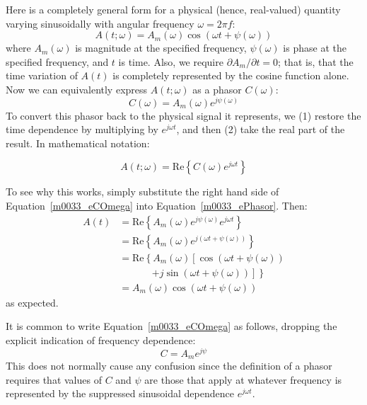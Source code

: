Here is a completely general form for a physical (hence, real-valued) quantity varying sinusoidally with angular frequency $\omega=2\pi f$:
%
\begin{equation}
A(t;\omega) = A_m(\omega) \cos{(\omega t + \psi(\omega))}
\end{equation} 
%
where 
$A_m(\omega)$ is magnitude at the specified frequency, 
$\psi(\omega)$ is phase at the specified frequency, 
and $t$ is time.  
Also, we require $\partial A_m/\partial t =0$; that is, that the time variation of $A(t)$ is completely represented by the cosine function alone. 
Now we can equivalently express $A(t;\omega)$ as a phasor $C(\omega)$:
%
\begin{equation}
C(\omega) = A_m(\omega) e^{j\psi(\omega)}
\label{m0033_eCOmega}
\end{equation}
%
To convert this phasor back to the physical signal it represents, we (1) restore the time dependence by multiplying by $e^{j\omega t}$, and then (2) take the real part of the result.  In mathematical notation: 
%
\begin{mdframed}[backgroundcolor=yellow!20,nobreak=true] 
\begin{equation}
A(t;\omega) = \mbox{R{e}} \left\{ C(\omega) e^{j\omega t} \right\}
\label{m0033_ePhasor}
\end{equation} 
\end{mdframed}
%
To see why this works, simply substitute the right hand side of Equation~\ref{m0033_eCOmega} into Equation~\ref{m0033_ePhasor}.  Then:
\begin{equation}
\begin{split}
A(t) & = \mbox{Re}\left\{ A_m(\omega) e^{j\psi(\omega)} e^{j\omega t} \right\} \\
    ~& = \mbox{Re}\left\{ A_m(\omega) e^{j\left(\omega t + \psi(\omega)\right)} \right\} \\
    ~& = \mbox{Re}\left\{ A_m(\omega) \left[   \cos\left(\omega t + \psi(\omega)\right)  \right. \right. \\
    ~& ~~~~~~~~~~~~~~~ \left.              \left. +j\sin\left(\omega t + \psi(\omega)\right)  \right] \right\} \\
    ~& = A_m(\omega) \cos\left(\omega t + \psi(\omega)\right) 
\end{split}
\nonumber
\end{equation}
%
as expected.

It is common to write Equation~\ref{m0033_eCOmega} as follows, dropping the explicit indication of frequency dependence:
%
\begin{equation}
C = A_m e^{j\psi}
\end{equation}
%
This does not normally cause any confusion since the definition of a phasor requires that values of $C$ and $\psi$ are those that apply at whatever frequency is represented by the suppressed sinusoidal dependence $e^{j\omega t}$.   

